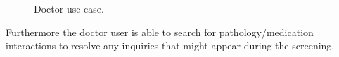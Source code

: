 \begin{figure}[h]
	\begin{center}
	\end{center}
	\caption{Doctor use case.}\label{fig:doctor_use_case}
\end{figure}

Furthermore the doctor user is able to search for pathology/medication interactions to resolve any inquiries that might appear during the screening.

